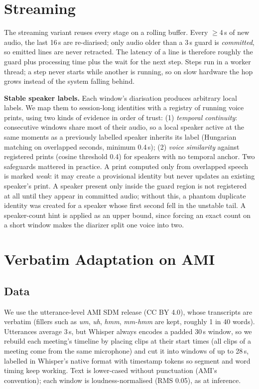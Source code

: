 \documentclass[conference]{IEEEtran}
\begin{document}
\section{Streaming}\label{sec:streaming}
The streaming variant reuses every stage on a rolling buffer. Every $\ge$4\,s of new audio, the last 16\,s are re-diarised; only audio older than a 3\,s guard is \emph{committed}, so emitted lines are never retracted. The latency of a line is therefore roughly the guard plus processing time plus the wait for the next step. Steps run in a worker thread; a step never starts while another is running, so on slow hardware the hop grows instead of the system falling behind.

\textbf{Stable speaker labels.} Each window's diarisation produces arbitrary local labels. We map them to session-long identities with a registry of running voice prints, using two kinds of evidence in order of trust: (1) \emph{temporal continuity}: consecutive windows share most of their audio, so a local speaker active at the same moments as a previously labelled speaker inherits its label (Hungarian matching on overlapped seconds, minimum 0.4\,s); (2) \emph{voice similarity} against registered prints (cosine threshold 0.4) for speakers with no temporal anchor. Two safeguards mattered in practice. A print computed only from overlapped speech is marked \emph{weak}: it may create a provisional identity but never updates an existing speaker's print. A speaker present only inside the guard region is not registered at all until they appear in committed audio; without this, a phantom duplicate identity was created for a speaker whose first second fell in the unstable tail. A speaker-count hint is applied as an upper bound, since forcing an exact count on a short window makes the diarizer split one voice into two.

\section{Verbatim Adaptation on AMI}\label{sec:finetune}
\subsection{Data}
We use the utterance-level AMI SDM release (CC BY 4.0), whose transcripts are verbatim (fillers such as \emph{um}, \emph{uh}, \emph{hmm}, \emph{mm-hmm} are kept, roughly 1 in 40 words). Utterances average 3\,s, but Whisper always encodes a padded 30\,s window, so we rebuild each meeting's timeline by placing clips at their start times (all clips of a meeting come from the same microphone) and cut it into windows of up to 28\,s, labelled in Whisper's native format with timestamp tokens so segment and word timing keep working. Text is lower-cased without punctuation (AMI's convention); each window is loudness-normalised (RMS 0.05), as at inference.
\end{document}
